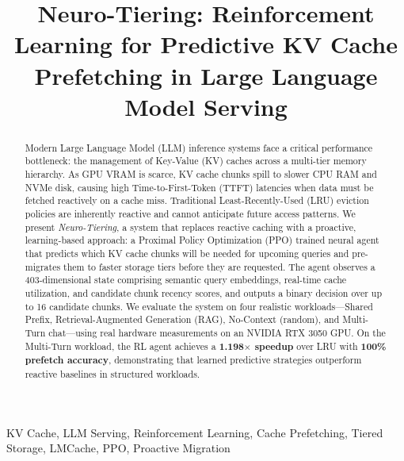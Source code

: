 \documentclass[conference]{IEEEtran}
\begin{document}
\title{Neuro-Tiering: Reinforcement Learning for Predictive KV Cache Prefetching in Large Language Model Serving}

\author{
\and
{}
}

\maketitle

\begin{abstract}
Modern Large Language Model (LLM) inference systems face a critical performance bottleneck: the management of Key-Value (KV) caches across a multi-tier memory hierarchy. As GPU VRAM is scarce, KV cache chunks spill to slower CPU RAM and NVMe disk, causing high Time-to-First-Token (TTFT) latencies when data must be fetched reactively on a cache miss. Traditional Least-Recently-Used (LRU) eviction policies are inherently reactive and cannot anticipate future access patterns. We present \emph{Neuro-Tiering}, a system that replaces reactive caching with a proactive, learning-based approach: a Proximal Policy Optimization (PPO) trained neural agent that predicts which KV cache chunks will be needed for upcoming queries and pre-migrates them to faster storage tiers before they are requested. The agent observes a 403-dimensional state comprising semantic query embeddings, real-time cache utilization, and candidate chunk recency scores, and outputs a binary decision over up to 16 candidate chunks. We evaluate the system on four realistic workloads---Shared Prefix, Retrieval-Augmented Generation (RAG), No-Context (random), and Multi-Turn chat---using real hardware measurements on an NVIDIA RTX 3050 GPU. On the Multi-Turn workload, the RL agent achieves a \textbf{1.198$\times$ speedup} over LRU with \textbf{100\% prefetch accuracy}, demonstrating that learned predictive strategies outperform reactive baselines in structured workloads.
\end{abstract}

\begin{IEEEkeywords}
KV Cache, LLM Serving, Reinforcement Learning, Cache Prefetching, Tiered Storage, LMCache, PPO, Proactive Migration
\end{IEEEkeywords}
\end{document}
